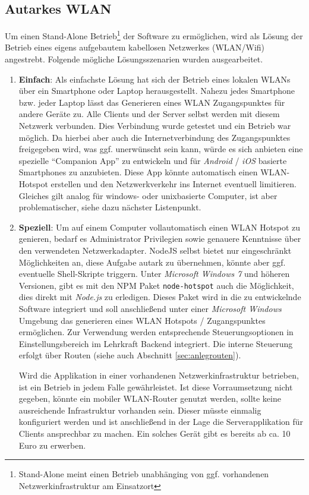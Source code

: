 \subsection{Autarkes WLAN}\label{sec:eigeneswlan}
Um einen Stand-Alone Betrieb\footnote{Stand-Alone meint einen Betrieb unabhänging von ggf. vorhandenen Netzwerkinfrastruktur am Einsatzort} der Software zu ermöglichen, wird als Lösung der Betrieb eines eigens aufgebautem kabellosen Netzwerkes (WLAN/Wifi) angestrebt. Folgende mögliche Lösungsszenarien wurden ausgearbeitet.
\begin{enumerate}
	\item \textbf{Einfach}: Als einfachste Lösung hat sich der Betrieb eines lokalen WLANs über ein Smartphone oder Laptop herausgestellt. Nahezu jedes Smartphone bzw. jeder Laptop lässt das Generieren eines WLAN Zugangspunktes für andere Geräte zu. Alle Clients und der Server selbst werden mit diesem Netzwerk verbunden. Dies Verbindung wurde getestet und ein Betrieb war möglich. Da hierbei aber auch die Internetverbindung des Zugangspunktes freigegeben wird, was ggf. unerwünscht sein kann, würde es sich anbieten eine spezielle "`Companion App"' zu entwickeln und für \emph{Android} / \emph{iOS} basierte Smartphones zu anzubieten. Diese App könnte automatisch einen WLAN-Hotspot erstellen und den Netzwerkverkehr ins Internet eventuell limitieren. Gleiches gilt analog für windows- oder unixbasierte Computer, ist aber problematischer, siehe dazu nächster Listenpunkt.
	\item \textbf{Speziell}: Um auf einem Computer vollautomatisch einen WLAN Hotspot zu genieren, bedarf es Administrator Privilegien sowie genauere Kenntnisse über den verwendeten Netzwerkadapter. NodeJS selbst bietet nur eingeschränkt Möglichkeiten an, diese Aufgabe autark zu übernehmen, könnte aber ggf. eventuelle Shell-Skripte triggern. Unter \emph{Microsoft Windows 7} und höheren Versionen, gibt es mit den NPM Paket \texttt{node-hotspot} auch die Möglichkeit, dies direkt mit \emph{Node.js} zu erledigen. Dieses Paket wird in die zu entwickelnde Software integriert und soll anschließend unter einer \emph{Microsoft Windows} Umgebung das generieren eines WLAN Hotspots / Zugangspunktes ermöglichen. Zur Verwendung werden entsprechende Steuerungsoptionen in Einstellungsbereich im Lehrkraft Backend integriert. Die interne Steuerung erfolgt über Routen (siehe auch Abschnitt \ref{sec:anlegrouten}).
	
Wird die Applikation in einer vorhandenen Netzwerkinfrastruktur betrieben, ist ein Betrieb in jedem Falle gewährleistet. Ist diese Vorraumsetzung nicht gegeben, könnte ein mobiler WLAN-Router genutzt werden, sollte keine ausreichende Infrastruktur vorhanden sein. Dieser müsste einmalig konfiguriert werden und ist anschließend in der Lage die Serverapplikation für Clients ansprechbar zu machen. Ein solches Gerät gibt es bereits ab ca. 10 Euro zu erwerben.
\end{enumerate} 

